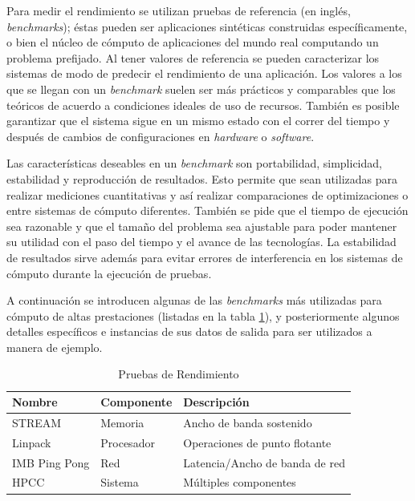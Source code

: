 \documentclass[a4paper]{report}
\begin{document}
Para medir el rendimiento se utilizan pruebas de referencia (en inglés, {\em benchmarks}); éstas pueden ser aplicaciones sintéticas construidas específicamente, o bien el núcleo de cómputo de aplicaciones del mundo real computando un problema prefijado. Al tener valores de referencia se pueden caracterizar los sistemas de modo de predecir el rendimiento de una aplicación.
Los valores a los que se llegan con un {\it benchmark} suelen ser más prácticos y comparables que los teóricos de acuerdo a condiciones ideales de uso de recursos.
También es posible garantizar que el sistema sigue en un mismo estado con el correr del tiempo y después de cambios de configuraciones en {\it hardware} o {\it software}.

\bigskip

Las características deseables en un {\it benchmark} son portabilidad, simplicidad, estabilidad y reproducción de resultados. Esto permite que sean utilizadas para realizar mediciones cuantitativas y así realizar comparaciones de optimizaciones o entre sistemas de cómputo diferentes. También se pide que el tiempo de ejecución sea razonable y que el tamaño del problema sea ajustable para poder mantener su utilidad con el paso del tiempo y el avance de las tecnologías. La estabilidad de resultados sirve además para evitar errores de interferencia en los sistemas de cómputo durante la ejecución de pruebas.

\bigskip

A continuación se introducen algunas de las {\it benchmarks} más utilizadas para cómputo de altas prestaciones (listadas en la tabla \ref{table:benchmark-list}),
y posteriormente algunos detalles específicos e instancias de sus datos de salida para ser utilizados a manera de ejemplo.

\begin{table}[H]
    \caption{Pruebas de Rendimiento}
    \centering
    \begin{tabular}{|l|l|l|}\hline
      {\bf Nombre} & {\bf Componente} & {\bf Descripción} \\ \hline
      STREAM & Memoria & Ancho de banda sostenido \\ \hline
      Linpack & Procesador & Operaciones de punto flotante \\ \hline
      IMB Ping Pong & Red & Latencia/Ancho de banda de red \\ \hline
      HPCC & Sistema & Múltiples componentes \\ \hline
        \end{tabular}
  \label{table:benchmark-list}
\end{table}
\end{document}
